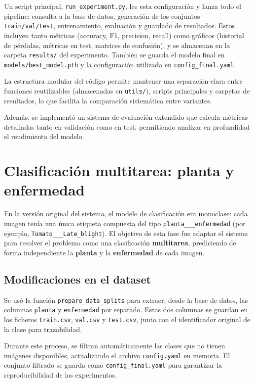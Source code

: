 \documentclass[12pt,a4paper]{article}
\begin{document}
Un script principal, \texttt{run\_experiment.py}, lee esta configuración y lanza todo el pipeline: consulta a la base de datos, generación de los conjuntos \texttt{train/val/test}, entrenamiento, evaluación y guardado de resultados. Estos incluyen tanto métricas (accuracy, F1, precision, recall) como gráficos (historial de pérdidas, métricas en test, matrices de confusión), y se almacenan en la carpeta \texttt{results/} del experimento. También se guarda el modelo final en \texttt{models/best\_model.pth} y la configuración utilizada en \texttt{config\_final.yaml}.

La estructura modular del código permite mantener una separación clara entre funciones reutilizables (almacenadas en \texttt{utils/}), scripts principales y carpetas de resultados, lo que facilita la comparación sistemática entre variantes.

Además, se implementó un sistema de evaluación extendido que calcula métricas detalladas tanto en validación como en test, permitiendo analizar en profundidad el rendimiento del modelo.

\section{Clasificación multitarea: planta y enfermedad}

En la versión original del sistema, el modelo de clasificación era monoclase: cada imagen tenía una única etiqueta compuesta del tipo \texttt{planta\_\_\_enfermedad} (por ejemplo, \texttt{Tomato\_\_\_Late\_blight}). El objetivo de esta fase fue adaptar el sistema para resolver el problema como una clasificación \textbf{multitarea}, prediciendo de forma independiente la \textbf{planta} y la \textbf{enfermedad} de cada imagen.

\subsection{Modificaciones en el dataset}

Se usó la función \texttt{prepare\_data\_splits} para extraer, desde la base de datos, las columnas \texttt{planta} y \texttt{enfermedad} por separado. Estas dos columnas se guardan en los ficheros \texttt{train.csv}, \texttt{val.csv} y \texttt{test.csv}, junto con el identificador original de la clase para trazabilidad.

Durante este proceso, se filtran automáticamente las clases que no tienen imágenes disponibles, actualizando el archivo \texttt{config.yaml} en memoria. El conjunto filtrado se guarda como \texttt{config\_final.yaml} para garantizar la reproducibilidad de los experimentos.
\end{document}
